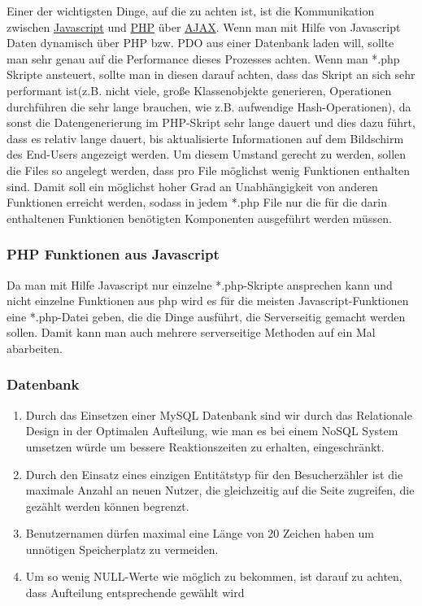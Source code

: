 \documentclass[10pt,a4paper]{scrartcl}
\begin{document}
Einer der wichtigsten Dinge, auf die zu achten ist, ist die Kommunikation zwischen \underline{Javascript} und \underline{PHP}
über \underline{AJAX}. Wenn man mit Hilfe von Javascript Daten dynamisch über PHP bzw. PDO aus einer Datenbank laden will, sollte man
sehr genau auf die Performance dieses Prozesses achten. Wenn man *.php Skripte ansteuert, sollte man in diesen darauf achten, dass
das Skript an sich sehr performant ist(z.B. nicht viele, große Klassenobjekte generieren, Operationen durchführen die sehr lange brauchen,
wie z.B. aufwendige Hash-Operationen), da sonst die Datengenerierung im PHP-Skript sehr lange dauert und dies dazu führt, dass
es relativ lange dauert, bis aktualisierte Informationen auf dem Bildschirm des End-Users angezeigt werden.
\newline \newline
Um diesem Umstand gerecht zu werden, sollen die Files so angelegt werden, dass pro File möglichst wenig Funktionen enthalten sind.
Damit soll ein möglichst hoher Grad an Unabhängigkeit von anderen Funktionen erreicht werden, sodass in jedem *.php File nur die
für die darin enthaltenen Funktionen benötigten Komponenten ausgeführt werden müssen.

\subsubsection*{PHP Funktionen aus Javascript}

Da man mit Hilfe Javascript nur einzelne *.php-Skripte ansprechen kann und nicht einzelne Funktionen aus php wird es für die meisten Javascript-Funktionen eine *.php-Datei geben, die die Dinge ausführt, die Serverseitig gemacht werden sollen. Damit kann man auch mehrere serverseitige Methoden auf ein Mal abarbeiten.


\subsubsection*{Datenbank}

\begin{enumerate}
 \item Durch das Einsetzen einer MySQL Datenbank sind wir durch das Relationale Design in der Optimalen Aufteilung, wie man es bei einem NoSQL System umsetzen würde um bessere Reaktionszeiten zu erhalten, eingeschränkt.
 \item Durch den Einsatz eines einzigen Entitätstyp für den Besucherzähler ist die maximale Anzahl an neuen Nutzer, die gleichzeitig auf die Seite zugreifen, die gezählt werden können begrenzt.
 \item Benutzernamen dürfen maximal eine Länge von 20 Zeichen haben um unnötigen Speicherplatz zu vermeiden.
 \item Um so wenig NULL-Werte wie möglich zu bekommen, ist darauf zu achten, dass Aufteilung entsprechende gew\"ahlt wird
\end{enumerate}
\end{document}
